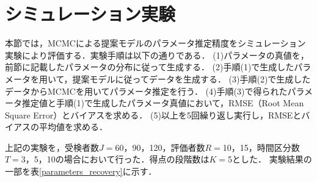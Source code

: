 \documentclass[twocolumn,10pt]{jsarticle}
\begin{document}
\section{シミュレーション実験}
\vspace{-2mm}

本節では，MCMCによる提案モデルのパラメータ推定精度をシミュレーション実験により評価する．実験手順は以下の通りである．
(1)パラメータの真値を，前節に記載したパラメータの分布に従って生成する．
(2)手順(1)で生成したパラメータを用いて，提案モデルに従ってデータを生成する．
(3)手順(2)で生成したデータからMCMCを用いてパラメータ推定を行う．
(4)手順(3)で得られたパラメータ推定値と手順(1)で生成したパラメータ真値において，RMSE（Root Mean Square Error）とバイアスを求める．
(5)以上を5回繰り返し実行し，RMSEとバイアスの平均値を求める．

上記の実験を，受検者数$J=$60，90，120，評価者数$R=$10，15，時間区分数$T=$3，5，10の場合において行った．得点の段階数は$K=$5とした．
実験結果の一部を表\ref{parameters_recovery}に示す．
\end{document}
